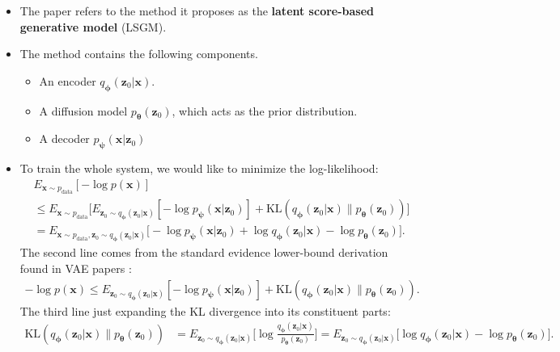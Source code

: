\documentclass[10pt]{article}
\newcommand{\ve}[1]{\mathbf{#1}}
\newcommand{\ves}[1]{\boldsymbol{#1}}
\newcommand{\mrm}[1]{\mathrm{#1}}
\newcommand{\data}{\mathrm{data}}
\begin{document}
\begin{itemize}
  \item The paper refers to the method it proposes as the {\bf latent score-based generative model} (LSGM).
  
  \item The method contains the following components.
  \begin{itemize}
    \item An encoder $q_{\ves{\phi}}(\ve{z}_0|\ve{x})$.
    \item A diffusion model $p_{\ves{\theta}}(\ve{z}_0)$, which acts as the prior distribution.
    \item A decoder $p_{\ves{\psi}}(\ve{x}|\ve{z}_0)$
  \end{itemize}

  \item To train the whole system, we would like to minimize the log-likelihood:
  \begin{align*}
    &E_{\ve{x} \sim p_{\data}} [-\log p(\ve{x})] \\
    &\leq E_{\ve{x} \sim p_{\data}} \bigg[
      E_{\ve{z}_0 \sim q_{\ves{\phi}}(\ve{z}_0|\ve{x})}[-\log p_{\ves{\psi}}(\ve{x}|\ve{z}_0)]
      + \mrm{KL}(q_{\ves{\phi}}(\ve{z}_0|\ve{x})\| p_{\ves{\theta}}(\ve{z}_0)) 
    \bigg] \\
    &= E_{\ve{x} \sim p_{\data}, \ve{z}_0 \sim q_{\ves{\phi}}(\ve{z}_0|\ve{x})}
    \Big[-\log p_{\ves{\psi}}(\ve{x}|\ve{z}_0) + \log q_{\ves{\phi}}(\ve{z}_0|\ve{x}) - \log p_{\ves{\theta}}(\ve{z}_0)\Big].
  \end{align*}
  The second line comes from the standard evidence lower-bound derivation found in VAE papers \cite{KhungurnVAE}:
  \begin{align*}
    -\log p(\ve{x}) \leq E_{\ve{z}_0 \sim q_{\ves{\phi}}(\ve{z}_0|\ve{x})}[-\log p_{\ves{\psi}}(\ve{x}|\ve{z}_0)]
    + \mrm{KL}(q_{\ves{\phi}}(\ve{z}_0|\ve{x})\| p_{\ves{\theta}}(\ve{z}_0)).
  \end{align*}
  The third line just expanding the KL divergence into its constituent parts:
  \begin{align*}
    \mrm{KL}(q_{\ves{\phi}}(\ve{z}_0|\ve{x})\| p_{\ves{\theta}}(\ve{z}_0)) 
    &= E_{\ve{z}_0 \sim q_{\ves{\phi}}(\ve{z}_0|\ve{x})}\bigg[ \log \frac{q_{\ves{\phi}}(\ve{z}_0|\ve{x})}{p_{\ves{\theta}}(\ve{z}_0)} \bigg]
    = E_{\ve{z}_0 \sim q_{\ves{\phi}}(\ve{z}_0|\ve{x})}\Big[ \log q_{\ves{\phi}}(\ve{z}_0|\ve{x})- \log p_{\ves{\theta}}(\ve{z}_0) \Big].
  \end{align*}


\end{itemize}
\end{document}
